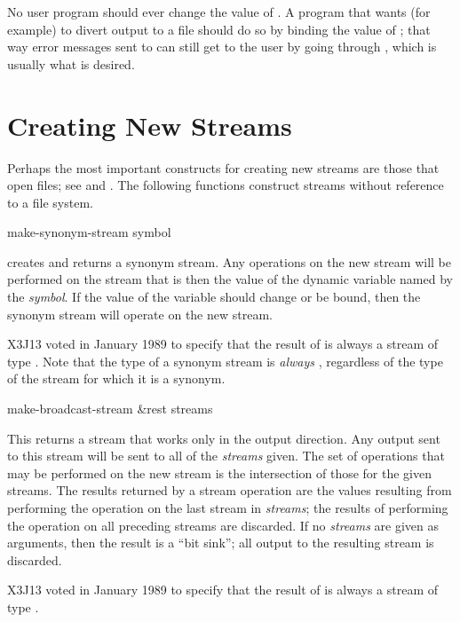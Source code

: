 No user program should ever change the value of .  A program
that wants (for example) to divert output to a file should do so by binding
the value of ; that way error messages sent to
 can still get to the user by going through ,
which is usually what is desired.

\section {Creating New Streams}

Perhaps the most important constructs for creating new streams
are those that open files; see  and .
The following functions construct streams without reference to a file system.

\begin{defun}[Function]
make-synonym-stream symbol

 creates and returns
a synonym stream.
Any operations on the new stream will be performed on the stream
that is then the value of the dynamic variable named by the \emph{symbol}.
If the value of the variable should change or be bound,
then the synonym stream will operate on the new stream.

\begin{new}
X3J13 voted in January 1989
to specify that the result of
 is always a stream of type .
Note that the type of a synonym stream is \emph{always} ,
regardless of the type of the stream for which it is a synonym.
\end{new}
\end{defun}

\begin{defun}[Function]
make-broadcast-stream &rest streams

This returns a stream that works only in the output direction.  Any output
sent to this stream will be sent to all of the \emph{streams} given.
The set of
operations that may be performed on the new stream is the intersection
of those for the given streams.  The results returned by a stream
operation are the values resulting from
performing the operation on the last stream in \emph{streams}; the
results of performing the operation on all preceding streams are
discarded.
If no \emph{streams} are given as arguments, then the result
is a ``bit sink''; all output to the resulting stream is discarded.
\begin{new}
X3J13 voted in January 1989
to specify that the result of
 is always a stream of type .
\end{new}
\end{defun}

